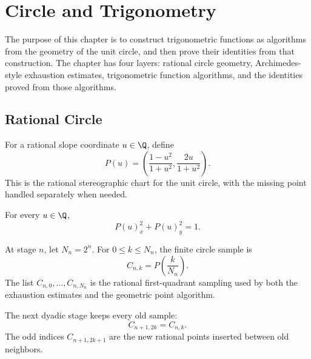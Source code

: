 \chapter{Circle and Trigonometry}
\label{ch:rational-circle-trigonometry}

The purpose of this chapter is to construct trigonometric functions as
algorithms from the geometry of the unit circle, and then prove their
identities from that construction.  The chapter has four layers: rational
circle geometry, Archimedes-style exhaustion estimates, trigonometric
function algorithms, and the identities proved from those algorithms.

\section{Rational Circle}

\begin{definition}
\label{def:rational-circle-point}
For a rational slope coordinate \(u\in\Q\), define
\[
  P(u)=
  \left(
    \frac{1-u^2}{1+u^2},
    \frac{2u}{1+u^2}
  \right).
\]
This is the rational stereographic chart for the unit circle, with the
missing point handled separately when needed.
\end{definition}

\begin{theorem}
\label{thm:rational-circle-equation}
\leanok
For every \(u\in\Q\),
\[
  P(u)_x^2+P(u)_y^2=1.
\]
\end{theorem}

\begin{definition}
\label{def:dyadic-rational-circle-stages}
At stage \(n\), let \(N_n=2^n\).  For \(0\le k\le N_n\), the finite circle
sample is
\[
  C_{n,k}=P\left(\frac{k}{N_n}\right).
\]
The list \(C_{n,0},\ldots,C_{n,N_n}\) is the rational first-quadrant
sampling used by both the exhaustion estimates and the geometric point
algorithm.
\end{definition}

\begin{theorem}
\label{thm:dyadic-rational-circle-refinement}
\leanok
The next dyadic stage keeps every old sample:
\[
  C_{n+1,2k}=C_{n,k}.
\]
The odd indices \(C_{n+1,2k+1}\) are the new rational points inserted between
old neighbors.
\end{theorem}

